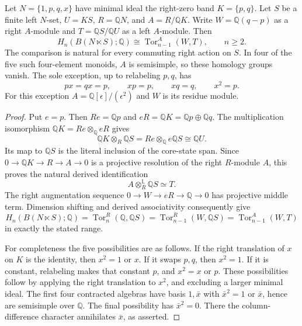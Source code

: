 \begin{lemma}
\label{C:four-corner-action-tail}
Let $N=\{1,p,q,x\}$ have minimal ideal the right-zero band
$K=\{p,q\}$.  Let $S$ be a finite left $N$-set, $U=KS$,
$R=\mathbb QN$, and $A=R/\mathbb QK$.  Write
$W=\mathbb Q(q-p)$ as a right $A$-module and
$T=\mathbb QS/\mathbb QU$ as a left $A$-module.  Then
\[
 H_n(B(N\ltimes S);\mathbb Q)
   \cong \operatorname{Tor}_{n-1}^{A}(W,T),
 \qquad n\geq2.
\]
The comparison is natural for every commuting right action
on $S$.  In four of the five such four-element monoids, $A$
is semisimple, so these homology groups vanish.  The sole
exception, up to relabeling $p,q$, has
\[
 px=qx=p,\qquad xp=p,\qquad xq=q,\qquad x^2=p.
\]
For this exception $A=\mathbb Q[\epsilon]/(\epsilon^2)$
and $W$ is its residue module.
\end{lemma}
\begin{proof}
Put $e=p$.  Then $Re=\mathbb Qp$ and
$eR=\mathbb QK=\mathbb Qp\oplus\mathbb Qq$.
The multiplication isomorphism
$\mathbb QK=Re\otimes_{\mathbb Q}eR$ gives
\[
 \mathbb QK\otimes_R\mathbb QS
   =Re\otimes_{\mathbb Q}e\mathbb QS
   \cong\mathbb QU.
\]
Its map to $\mathbb QS$ is the literal inclusion of the
core-state span.  Since
$0\to\mathbb QK\to R\to A\to0$ is a projective resolution
of the right $R$-module $A$, this proves the natural derived
identification
\[
 A\otimes_R^{\mathbb L}\mathbb QS\simeq T.
\]
The right augmentation sequence
$0\to W\to eR\to\mathbb Q\to0$ has projective middle term.
Dimension shifting and derived associativity consequently give
\[
 H_n(B(N\ltimes S);\mathbb Q)
 =\operatorname{Tor}_{n}^{R}(\mathbb Q,\mathbb QS)
 =\operatorname{Tor}_{n-1}^{R}(W,\mathbb QS)
 =\operatorname{Tor}_{n-1}^{A}(W,T)
\]
in exactly the stated range.

For completeness the five possibilities are as follows.
If the right translation of $x$ on $K$ is the identity, then
$x^2=1$ or $x$.  If it swaps $p,q$, then $x^2=1$.
If it is constant, relabeling makes that constant $p$,
and $x^2=x$ or $p$.  These possibilities follow by applying
the right translation to $x^2$, and excluding a larger
minimal ideal.  The first four contracted algebras have
basis $1,\bar x$ with $\bar x^2=1$ or $\bar x$, hence
are semisimple over $\mathbb Q$.  The final possibility
has $\bar x^2=0$.  There the column-difference character
annihilates $\bar x$, as asserted.
\end{proof}

